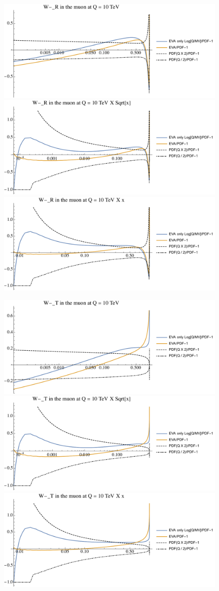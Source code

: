 \documentclass[a4paper,11pt]{article}
\begin{document}
\begin{figure}[ht]
\includegraphics[width=0.46\linewidth]{PlotPDFs/ratios/10TeV/W-_R_Q.pdf}
\includegraphics[width=0.46\linewidth]{PlotPDFs/ratios/10TeV/W-_R_Qsqrtx.pdf}
\includegraphics[width=0.46\linewidth]{PlotPDFs/ratios/10TeV/W-_R_Qx.pdf}
\end{figure}

\begin{figure}[ht]
\includegraphics[width=0.46\linewidth]{PlotPDFs/ratios/10TeV/W-_T_Q.pdf}
\includegraphics[width=0.46\linewidth]{PlotPDFs/ratios/10TeV/W-_T_Qsqrtx.pdf}
\includegraphics[width=0.46\linewidth]{PlotPDFs/ratios/10TeV/W-_T_Qx.pdf}
\end{figure}
\end{document}
